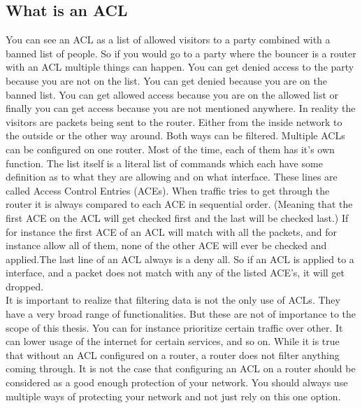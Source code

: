 \subsection{What is an ACL}
You can see an ACL as a list of allowed visitors to a party combined with a banned list of people. So if you would go to a party where the bouncer is a router with an ACL multiple things can happen. You can get denied access to the party because you are not on the list. You can get denied because you are on the banned list. You can get allowed access because you are on the allowed list or finally you can get access because you are not mentioned anywhere.
In reality the visitors are packets being sent to the router. Either from the inside network to the outside or the other way around. Both ways can be filtered. Multiple ACLs can be configured on one router. Most of the time, each of them has it's own function. The list itself is a literal list of commands which each have some definition as to what they are allowing and on what interface. These lines are called Access Control Entries (ACEs). When traffic tries to get through the router it is always compared to each ACE in sequential order. (Meaning that the first ACE on the ACL will get checked first and the last will be checked last.) If for instance the first ACE of an ACL will match with all the packets, and for instance allow all of them, none of the other ACE will ever be checked and applied.The last line of an ACL always is a deny all. So if an ACL is applied to a interface, and a packet does not match with any of the listed ACE's, it will get dropped. \\
It is important to realize that filtering data is not the only use of ACLs. They have a very broad range of functionalities. But these are not of importance to the scope of this thesis. You can for instance prioritize certain traffic over other. It can lower usage of the internet for certain services, and so on.
While it is true that without an ACL configured on a router, a router does not filter anything coming through. It is not the case that configuring an ACL on a router should be considered as a good enough protection of your network. You should always use multiple ways of protecting your network and not just rely on this one option.
